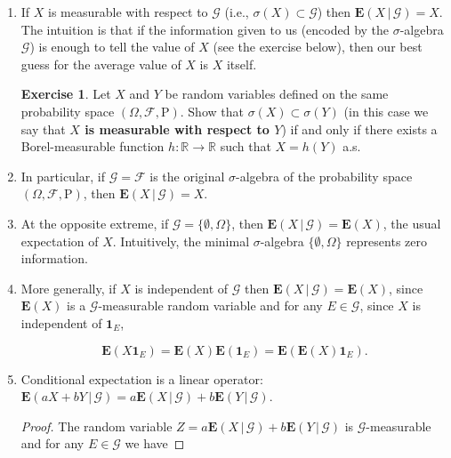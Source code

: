\documentclass[11pt]{report}
\newcommand{\R}{\mathbb{R}}
\theoremstyle{plain}
\theoremstyle{definition}
\newtheorem{xexercise}[thm]{Exercise}
\begin{document}
\begin{enumerate}[label=\arabic*.]
\item If $X$ is measurable with respect to $\mathcal{G}$
(i.e., $\sigma(X) \subset \mathcal{G}$) then
$\mathbf{E}\left(X\,|\,\mathcal{G}\right) = X$. The
intuition is that if the information given to us
(encoded by the $\sigma$-algebra $\mathcal{G}$) is
enough to tell the value of $X$ (see the exercise
below), then our best guess for the average value of
$X$ is $X$ itself.

\begin{xexercise}
Let $X$ and $Y$ be random variables defined on the
same probability space
$(\Omega, \mathcal{F}, \mathrm{P})$. Show that
$\sigma(X) \subset \sigma(Y)$ (in this case we say
that \textbf{$X$ is measurable with respect to $Y$}) if and
only if there exists a Borel-measurable function
$h:\R\to\R$ such that $X=h(Y)$ a.s.
\end{xexercise}

\item In particular, if $\mathcal{G}=\mathcal{F}$ is the
original $\sigma$-algebra of the probability space
$(\Omega, \mathcal{F}, \mathrm{P})$, then
$\mathbf{E}\left(X\,|\,\mathcal{G}\right) = X$.

\item At the opposite extreme, if
$\mathcal{G}= \{ \emptyset, \Omega \}$, then
$\mathbf{E}\left(X\,|\,\mathcal{G}\right) =
\mathbf{E}(X)$,
the usual expectation of $X$. Intuitively, the
minimal $\sigma$-algebra $\{\emptyset, \Omega\}$
represents zero information.

\item More generally, if $X$ is independent of $\mathcal{G}$
then
$\mathbf{E}\left(X\,|\,\mathcal{G}\right)=\mathbf{E}(X)$,
since $\mathbf{E}(X)$ is a $\mathcal{G}$-measurable
random variable and for any $E\in\mathcal{G}$, since
$X$ is independent of $\mathbf{1}_E$,

\[
\mathbf{E}(X\mathbf{1}_E) = \mathbf{E}(X)\mathbf{E}(\mathbf{1}_E) = \mathbf{E}(\mathbf{E}(X)\mathbf{1}_E).
\]

\item Conditional expectation is a linear operator:
$\mathbf{E}\left(aX+bY\,|\,\mathcal{G}\right) = a
\mathbf{E}\left(X\,|\,\mathcal{G}\right) + b
\mathbf{E}\left(Y\,|\,\mathcal{G}\right).$

\begin{proof}
The random variable
$Z=a \mathbf{E}\left(X\,|\,\mathcal{G}\right) + b
\mathbf{E}\left(Y\,|\,\mathcal{G}\right)$
is $\mathcal{G}$-measurable and for any
$E\in\mathcal{G}$ we have


\end{proof}
\end{enumerate}
\end{document}

